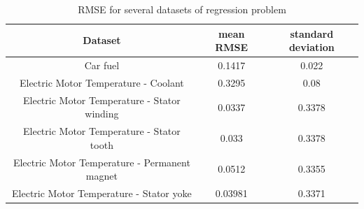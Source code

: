 \documentclass[12pt,a4paper]{article}
\begin{document}
\begin{table}[H]
	\centering
	\caption{RMSE for several datasets of regression problem}
	\footnotesize
	\setlength{\tabcolsep}{5pt}
	\begin{tabular}{ccc}
		\hline
		Dataset & mean RMSE & standard deviation \\
		\hline
		Car fuel & 0.1417 & 0.022 \\
        \hline
		Electric Motor Temperature - Coolant & 0.3295 & 0.08 \\
		\hline
		Electric Motor Temperature - Stator winding & 0.0337 & 0.3378 \\
		\hline
        Electric Motor Temperature - Stator tooth & 0.033 & 0.3378 \\
		\hline
        Electric Motor Temperature - Permanent magnet & 0.0512 & 0.3355 \\
		\hline
        Electric Motor Temperature - Stator yoke & 0.03981 & 0.3371 \\
		\hline
	\end{tabular} \label{tab:rmse-regression-results}
\end{table}
\end{document}
